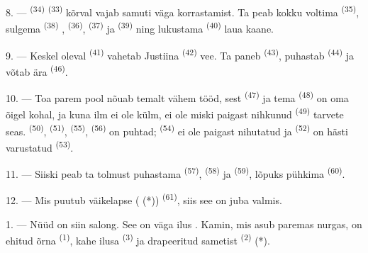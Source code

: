 8. ---  \textsuperscript{(34)}  \textsuperscript{(33)}
kõrval vajab samuti väga korrastamist. Ta peab kokku voltima 
\textsuperscript{(35)}, sulgema  \textsuperscript{(38)}
,  \textsuperscript{(36)}, 
\textsuperscript{(37)} ja  \textsuperscript{(39)} ning lukustama
 \textsuperscript{(40)} laua kaane.

9. --- Keskel oleval  \textsuperscript{(41)} vahetab Justiina
 \textsuperscript{(42)} vee. Ta paneb 
 \textsuperscript{(43)}, puhastab 
\textsuperscript{(44)} ja võtab ära  \textsuperscript{(46)}.

10. --- Toa parem pool nõuab temalt vähem tööd, sest 
\textsuperscript{(47)} ja tema  \textsuperscript{(48)} on oma õigel kohal,
ja kuna ilm ei ole külm, ei ole miski paigast nihkunud 
\textsuperscript{(49)} tarvete seas.  \textsuperscript{(50)},
 \textsuperscript{(51)},  \textsuperscript{(55)},
 \textsuperscript{(56)} on puhtad; 
\textsuperscript{(54)} ei ole paigast nihutatud ja 
\textsuperscript{(52)} on hästi varustatud  \textsuperscript{(53)}.


11. --- Siiski peab ta tolmust puhastama  \textsuperscript{(57)},
 \textsuperscript{(58)} ja 
\textsuperscript{(59)}, lõpuks pühkima  \textsuperscript{(60)}.

12. --- Mis puutub väikelapse ( (*)) 
\textsuperscript{(61)}, siis see on juba valmis.

\VUsaut{5.0mm}
\VUsaut{3.0mm}

1. --- Nüüd on siin salong. See on väga ilus . Kamin, mis asub paremas
nurgas, on ehitud õrna  \textsuperscript{(1)}, kahe ilusa
 \textsuperscript{(3)} ja drapeeritud sametist 
\textsuperscript{(2)} (*).

